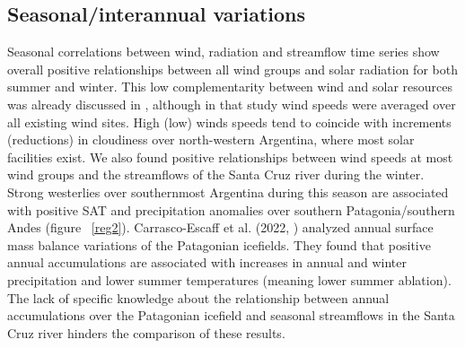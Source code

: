 \documentclass[AMA,Times1COL]{WileyNJDv5} %
\begin{document}
\begin{linenumbers}
\subsection{Seasonal/interannual variations}

Seasonal correlations between wind, radiation and streamflow time series show overall positive relationships between all wind groups and solar radiation for both summer and winter. This low complementarity between wind and solar resources was already discussed in  \cite{bianchi2022assessing}, although in that study wind speeds were averaged over all existing wind sites. High (low) winds speeds tend to coincide with increments (reductions) in cloudiness over north-western Argentina, where most solar facilities exist. We also found positive relationships between wind speeds at most wind groups and the streamflows of the Santa Cruz river during the winter. Strong westerlies over southernmost Argentina during this season are associated with positive SAT and precipitation anomalies over southern Patagonia/southern Andes (figure ~\ref{reg2}). Carrasco-Escaff et al. (2022, \cite{carrasco2022climatic}) analyzed annual surface mass balance variations of the Patagonian icefields. They found that positive annual accumulations are associated with increases in annual and winter precipitation and lower summer temperatures (meaning lower summer ablation). The lack of specific knowledge about the relationship between annual accumulations over the Patagonian icefield and seasonal streamflows in the Santa Cruz river hinders the comparison of these results. 


\end{linenumbers}
\end{document}
